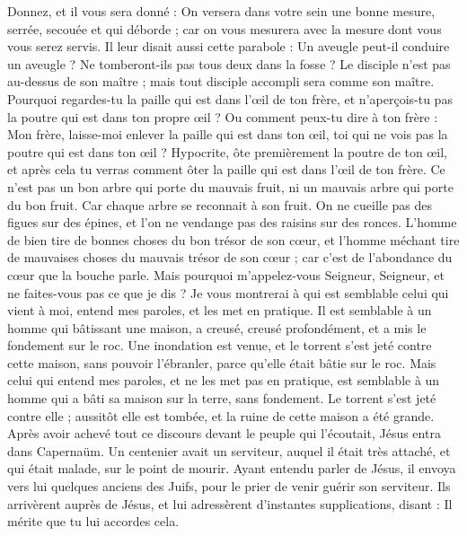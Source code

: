 \begin{multicols}{2}
Donnez, et il vous sera donné : On versera dans votre sein une bonne mesure, serrée, secouée et qui déborde ; car on vous mesurera avec la mesure dont vous vous serez servis.
Il leur disait aussi cette parabole : Un aveugle peut-il conduire un aveugle ? Ne tomberont-ils pas tous deux dans la fosse ?
Le disciple n'est pas au-dessus de son maître ; mais tout disciple accompli sera comme son maître.
Pourquoi regardes-tu la paille qui est dans l’œil de ton frère, et n’aperçois-tu pas la poutre qui est dans ton propre œil ?
Ou comment peux-tu dire à ton frère : Mon frère, laisse-moi enlever la paille qui est dans ton œil, toi qui ne vois pas la poutre qui est dans ton œil ? Hypocrite, ôte premièrement la poutre de ton œil, et après cela tu verras comment ôter la paille qui est dans l’œil de ton frère.
Ce n’est pas un bon arbre qui porte du mauvais fruit, ni un mauvais arbre qui porte du bon fruit.
Car chaque arbre se reconnait à son fruit. On ne cueille pas des figues sur des épines, et l’on ne vendange pas des raisins sur des ronces.
L'homme de bien tire de bonnes choses du bon trésor de son cœur, et l'homme méchant tire de mauvaises choses du mauvais trésor de son cœur ; car c'est de l'abondance du cœur que la bouche parle.
Mais pourquoi m'appelez-vous Seigneur, Seigneur, et ne faites-vous pas ce que je dis ?
Je vous montrerai à qui est semblable celui qui vient à moi, entend mes paroles, et les met en pratique.
Il est semblable à un homme qui bâtissant une maison, a creusé, creusé profondément, et a mis le fondement sur le roc. Une inondation est venue, et le torrent s’est jeté contre cette maison, sans pouvoir l’ébranler, parce qu’elle était bâtie sur le roc.
Mais celui qui entend mes paroles, et ne les met pas en pratique, est semblable à un homme qui a bâti sa maison sur la terre, sans fondement. Le torrent s’est jeté contre elle ; aussitôt elle est tombée, et la ruine de cette maison a été grande.
\VerseOne{}Après avoir achevé tout ce discours devant le peuple qui l'écoutait, Jésus entra dans Capernaüm.
Un centenier avait un serviteur, auquel il était très attaché, et qui était malade, sur le point de mourir.
Ayant entendu parler de Jésus, il envoya vers lui quelques anciens des Juifs, pour le prier de venir guérir son serviteur.
Ils arrivèrent auprès de Jésus, et lui adressèrent d’instantes supplications, disant : Il mérite que tu lui accordes cela.

\end{multicols}
